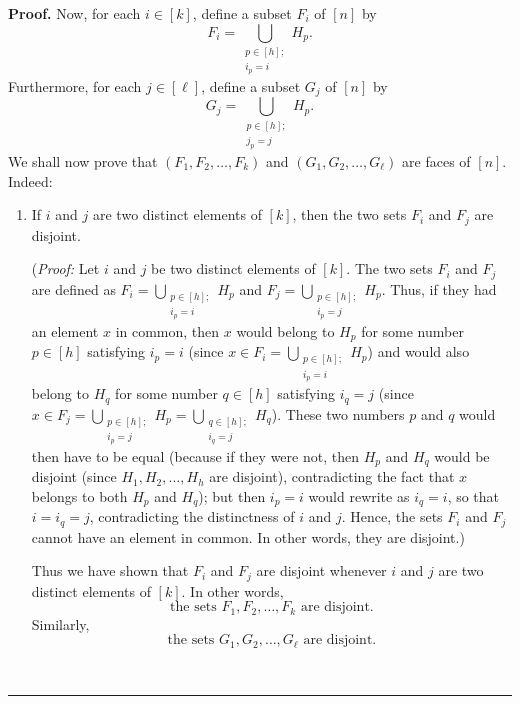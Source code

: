 \documentclass[12pt]{article}
\theoremstyle{definition}%
\theoremstyle{definition}%
\theoremstyle{remark}%
\newcommand{\interval}[1]{\left[ #1 \right]} %
\newenvironment{proof}[1][Proof]{\noindent\textbf{#1.} }{\ \rule{0.5em}{0.5em}}
\begin{document}
\begin{proof}
Now, for each $i\in\interval{k}  $, define a subset $F_{i}$ of
$\interval{n}$ by
\[
F_{i}=\bigcup\limits_{\substack{p\in\interval{h} ;\\i_{p}=i}}H_{p}.
\]
Furthermore, for each $j\in\interval{\ell}$, define a subset $G_{j}$ of
$\interval{n}$ by
\[
G_{j}=\bigcup\limits_{\substack{p\in\interval{h} ;\\j_{p}=j}}H_{p}.
\]
We shall now prove that $\left(  F_{1},F_{2},\ldots,F_{k}\right)  $ and
$\left(  G_{1},G_{2},\ldots,G_{\ell}\right)  $ are faces of $\interval{n}$.
Indeed:

\begin{enumerate}
\item If $i$ and $j$ are two distinct elements of $\interval{k}  $, then
the two sets $F_{i}$ and $F_{j}$ are disjoint.

(\textit{Proof:} Let $i$ and $j$ be two distinct elements of
$\interval{k}$. The two sets $F_{i}$ and $F_{j}$ are defined as $F_{i}
=\bigcup\limits_{\substack{p\in\interval{h} ;\\i_{p}=i}}H_{p}$ and
$F_{j}=\bigcup\limits_{\substack{p\in\interval{h} ;\\i_{p}=j}}H_{p}$.
Thus, if they had an element $x$ in common, then $x$ would belong to $H_{p}$
for some number $p\in\interval{h} $ satisfying $i_{p}=i$ (since $x\in
F_{i}=\bigcup\limits_{\substack{p\in\interval{h} ;\\i_{p}=i}}H_{p}$) and
would also belong to $H_{q}$ for some number $q\in\interval{h} $
satisfying $i_{q}=j$ (since $x\in F_{j}=\bigcup\limits_{\substack{p\in
\interval{h};\\i_{p}=j}}H_{p}=\bigcup\limits_{\substack{q\in\interval{h}
;\\i_{q}=j}}H_{q}$). These two numbers $p$ and $q$ would then have to be equal
(because if they were not, then $H_{p}$ and $H_{q}$ would be disjoint (since
$H_{1},H_{2},\ldots,H_{h}$ are disjoint), contradicting the fact that $x$
belongs to both $H_{p}$ and $H_{q}$); but then $i_{p}=i$ would rewrite as
$i_{q}=i$, so that $i=i_{q}=j$, contradicting the distinctness of $i$ and $j$.
Hence, the sets $F_{i}$ and $F_{j}$ cannot have an element in common. In other
words, they are disjoint.)

Thus we have shown that $F_{i}$ and $F_{j}$ are disjoint whenever $i$ and $j$
are two distinct elements of $\interval{k}  $. In other words,
\begin{equation}
\text{the sets }F_{1},F_{2},\ldots,F_{k}\text{ are disjoint.}
\label{pf.lem.face-int-bij.sur.Fdj}
\end{equation}
Similarly,
\begin{equation}
\text{the sets }G_{1},G_{2},\ldots,G_{\ell}\text{ are disjoint.}
\label{pf.lem.face-int-bij.sur.Gdj}
\end{equation}



\end{enumerate}
\end{proof}
\end{document}
